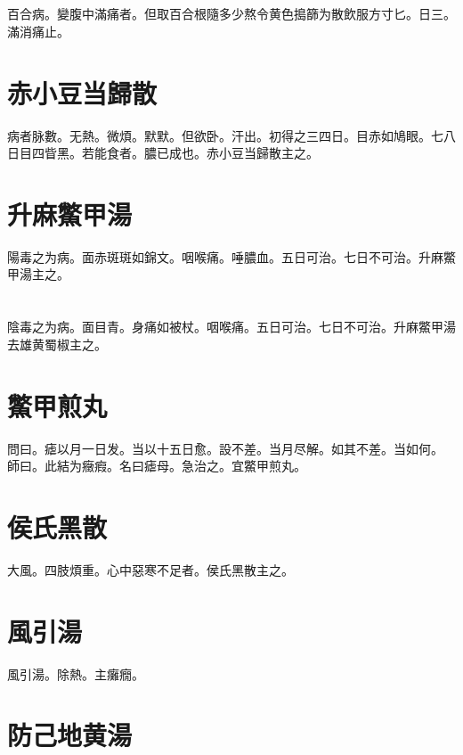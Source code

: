 \documentclass[b5paper,twoside,zihao=-4,UTF8]{ctexbook}
\begin{document}
\section{}

百合病。變腹中滿痛者。但取百合根隨多少熬令黄色搗篩为散飲服方寸匕。日三。滿消痛止。

\section{赤小豆当歸散}

病者脉數。无熱。微煩。默默。但欲卧。汗出。初得之三四日。目赤如鳩眼。七八日目四眥黑。若能食者。膿已成也。赤{小}豆当歸散主之。

\section{升麻鱉甲湯}

陽毒之为病。面赤斑斑如錦文。咽喉痛。唾膿血。五日可治。七日不可治。升麻鱉甲湯主之。

\section{}

陰毒之为病。面目青。身痛如被杖。咽喉痛。五日可治。七日不可治。升麻鱉甲湯去雄黄蜀椒主之。

\section{鱉甲煎丸}

問曰。瘧以月一日发。当以十五日愈。設不差。当月尽解。如其不差。当如何。\\
師曰。此結为癥瘕。名曰瘧母。急治之。宜鱉甲煎丸。

\section{侯氏黑散}

大風。四肢煩重。心中惡寒不足者。侯氏黑散主之。

\section{風引湯}

風引湯。除熱。主癱癇。

\section{防己地黄湯}
\end{document}
